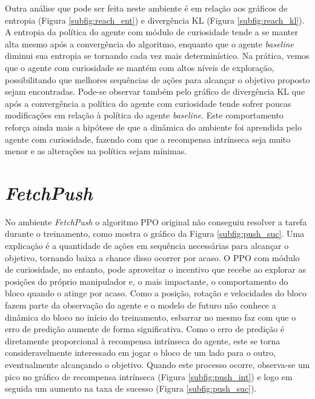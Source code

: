 Outra análise que pode ser feita neste ambiente é em relação aos gráficos de entropia (Figura \ref{subfig:reach_ent}) e divergência KL (Figura \ref{subfig:reach_kl}). A entropia da política do agente com módulo de curiosidade tende a se manter alta mesmo após a convergência do algoritmo, enquanto que o agente \textit{baseline} diminui sua entropia se tornando cada vez mais determinístico. Na prática, vemos que o agente com curiosidade se mantém com altos níveis de exploração, possibilitando que melhores sequências de ações para alcançar o objetivo proposto sejam encontradas. Pode-se observar também pelo gráfico de divergência KL que após a convergência a política do agente com curiosidade tende sofrer poucas modificações em relação à política do agente \textit{baseline}. Este comportamento reforça ainda mais a hipótese de que a dinâmica do ambiente foi aprendida pelo agente com curiosidade, fazendo com que a recompensa intrínseca seja muito menor e as alterações na política sejam mínimas.


\section{\textit{FetchPush}}
\label{sec:push}

No ambiente \textit{FetchPush} o algoritmo PPO original não conseguiu resolver a tarefa durante o treinamento, como mostra o gráfico da Figura \ref{subfig:push_suc}. Uma explicação é a quantidade de ações em sequência necessárias para alcançar o objetivo, tornando baixa a chance disso ocorrer por acaso. O PPO com módulo de curiosidade, no entanto, pode aproveitar o incentivo que recebe ao explorar as posições do próprio manipulador e, o mais impactante, o comportamento do bloco quando o atinge por acaso. Como a posição, rotação e velocidades do bloco fazem parte da observação do agente e o modelo de futuro não conhece a dinâmica do bloco no início do treinamento, esbarrar no mesmo faz com que o erro de predição aumente de forma significativa. Como o erro de predição é diretamente proporcional à recompensa intrínseca do agente, este se torna consideravelmente interessado em jogar o bloco de um lado para o outro, eventualmente alcançando o objetivo. Quando este processo ocorre, observa-se um pico no gráfico de recompensa intrínseca (Figura \ref{subfig:push_int}) e logo em seguida um aumento na taxa de sucesso (Figura \ref{subfig:push_suc}).


